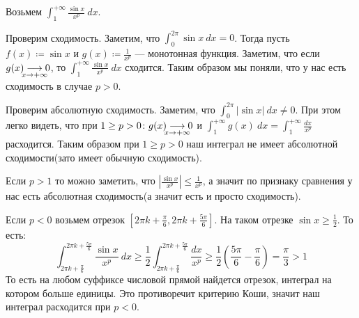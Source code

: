 \begin{example}
  Возьмем $\displaystyle \int_{1}^{+\infty} \frac{\sin x}{x^p} \: dx$.

  Проверим сходимость. Заметим, что $\int_{0}^{2\pi} \sin x \: dx = 0$. Тогда пусть $f(x) \coloneqq \sin x$ и $g(x) \coloneqq \frac{1}{x^p}$ --- монотонная функция.
  Заметим, что если $g(x) \underset{\mathclap{x \to +\infty}}{\longrightarrow} 0$, то
  $\int_{1}^{+\infty} \frac{\sin x}{x^p} \: dx$ сходится. Таким образом мы поняли, что у нас есть сходимость в случае $p > 0$.

  Проверим абсолютную сходимость. Заметим, что $\int_{0}^{2\pi} | \sin x | \: dx \neq 0$. При этом легко видеть, что при $1 \geq p > 0\colon g(x) \underset{\mathclap{x \to +\infty}}{\longrightarrow} 0$ и $\int_{1}^{+\infty} g(x) \: dx = \int_{1}^{+\infty} \frac{dx}{x^p}$ расходится. Таким образом при $1 \geq p > 0$ наш интеграл не имеет абсолютной сходимости(зато имеет обычную сходимость).

  Если $p > 1$ то можно заметить, что $\left | \frac{\sin x}{x^p} \right | \leq \frac{1}{x^p}$, а значит по признаку сравнения у нас есть абсолютная сходимость(а значит есть и просто сходимость).

  Если $p < 0$ возьмем отрезок $[2\pi k + \frac{\pi}{6}, 2\pi k + \frac{5\pi}{6}]$. На таком отрезке $\sin x \geq \frac{1}{2}$. То есть:
  \begin{equation*}
    \int_{2\pi k + \frac{\pi}{6}}^{2 \pi k + \frac{5 \pi}{6}}
    \frac{\sin x}{x^p} \: dx
    \geq
    \frac{1}{2} \int_{2\pi k + \frac{\pi}{6}}^{2\pi k + \frac{5 \pi}{6}}
    \frac{dx}{x^p}
    \geq
    \frac{1}{2}(\frac{5 \pi}{6} - \frac{\pi}{6}) = \frac{\pi}{3} > 1
  \end{equation*}
  То есть на любом суффиксе числовой прямой найдется отрезок, интеграл на котором больше единицы. Это противоречит критерию Коши, значит наш интеграл расходится при $p < 0$.
\end{example}
